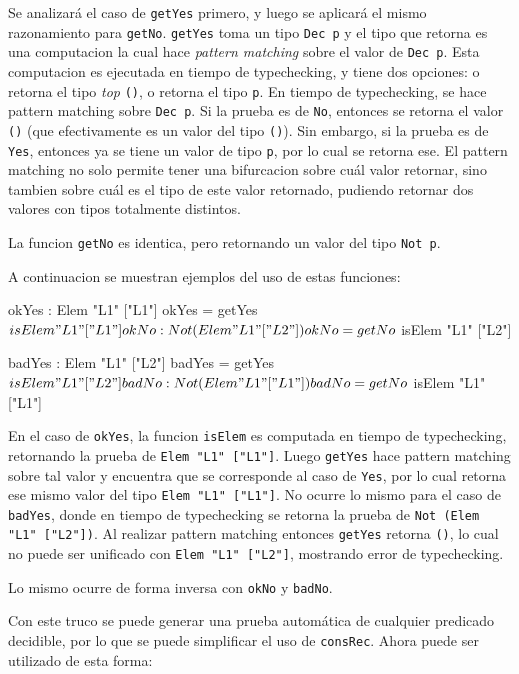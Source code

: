 Se analizará el caso de \texttt{getYes} primero, y luego se aplicará el mismo razonamiento para \texttt{getNo}.
\texttt{getYes} toma un tipo \texttt{Dec p} y el tipo que retorna es una computacion la cual hace \textit{pattern matching} sobre el valor de \texttt{Dec p}. Esta computacion es ejecutada en tiempo de typechecking, y tiene dos opciones: o retorna el tipo \textit{top} \texttt{()}, o retorna el tipo \texttt{p}.
En tiempo de typechecking, se hace pattern matching sobre \texttt{Dec p}. Si la prueba es de \texttt{No}, entonces se retorna el valor \texttt{()} (que efectivamente es un valor del tipo \texttt{()}). Sin embargo, si la prueba es de \texttt{Yes}, entonces ya se tiene un valor de tipo \texttt{p}, por lo cual se retorna ese. El pattern matching no solo permite tener una bifurcacion sobre cuál valor retornar, sino tambien sobre cuál es el tipo de este valor retornado, pudiendo retornar dos valores con tipos totalmente distintos.

La funcion \texttt{getNo} es identica, pero retornando un valor del tipo \texttt{Not p}.

A continuacion se muestran ejemplos del uso de estas funciones:

\begin{code}
okYes : Elem "L1" ["L1"]
okYes = getYes $ isElem "L1" ["L1"]

okNo : Not (Elem "L1" ["L2"])
okNo = getNo $ isElem "L1" ["L2"]

badYes : Elem "L1" ["L2"]
badYes = getYes $ isElem "L1" ["L2"]

badNo : Not (Elem "L1" ["L1"])
badNo = getNo $ isElem "L1" ["L1"]
\end{code}

En el caso de \texttt{okYes}, la funcion \texttt{isElem} es computada en tiempo de typechecking, retornando la prueba de \texttt{Elem "L1" ["L1"]}. Luego \texttt{getYes} hace pattern matching sobre tal valor y encuentra que se corresponde al caso de \texttt{Yes}, por lo cual retorna ese mismo valor del tipo \texttt{Elem "L1" ["L1"]}. No ocurre lo mismo para el caso de \texttt{badYes}, donde en tiempo de typechecking se retorna la prueba de \texttt{Not (Elem "L1" ["L2"])}. Al realizar pattern matching entonces \texttt{getYes} retorna \texttt{()}, lo cual no puede ser unificado con \texttt{Elem "L1" ["L2"]}, mostrando error de typechecking.

Lo mismo ocurre de forma inversa con \texttt{okNo} y \texttt{badNo}.

Con este truco se puede generar una prueba automática de cualquier predicado decidible, por lo que se puede simplificar el uso de \texttt{consRec}.
Ahora puede ser utilizado de esta forma:

